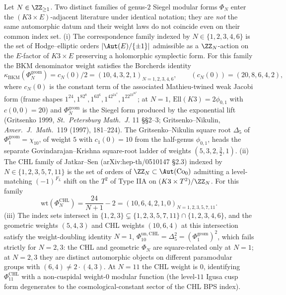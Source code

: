 \begin{theorem}
\label{thm:cy-c-beyond-k3e-chl-vs-programme-n-list}
Let $N\in\ZZ_{\ge 1}$. Two distinct families of genus-$2$ Siegel
modular forms $\Phi_N$ enter the $(K3\times E)$-adjacent literature
under identical notation; they are \emph{not} the same automorphic
datum and their weight laws do not coincide even on their common index
set.
\textup{(i)} The correspondence family indexed by $N\in\{1,2,3,4,6\}$ is the
set of Hodge--elliptic orders $|\Aut(E)/\{\pm 1\}|$ admissible as a
$\ZZ_N$-action on the $E$-factor of $K3\times E$ preserving a
holomorphic symplectic form. For this family the BKM denominator
weight satisfies the Borcherds identity
\begin{equation}
\label{eq:cy-c-beyond-k3e-programme-phi-N-weight}
\kappa_{\mathrm{BKM}}(\Phi_N^{\mathrm{geom}})
= c_N(0)/2
= (10,4,3,2,1)_{N=1,2,3,4,6},
\qquad
(c_N(0)) = (20,8,6,4,2),
\end{equation}
where $c_N(0)$ is the constant term of the associated Mathieu-twined
weak Jacobi form (frame shapes
$1^{24}, 1^82^8, 1^63^6, 1^42^24^4, 1^22^23^26^2$; at $N = 1$,
$\mathrm{Ell}(K3) = 2\phi_{0,1}$ with $c(0,0) = 20$) and
$\Phi_N^{\mathrm{geom}}$ is the Siegel form produced by the
exponential lift (Gritsenko 1999, \emph{St.\ Petersburg Math.\ J.}
11 §§2--3; Gritsenko--Nikulin, \emph{Amer.\ J.\ Math.}\ 119 (1997),
181--224). The Gritsenko--Nikulin square root $\Delta_5$ of
$\Phi_1^{\mathrm{geom}} = \chi_{10}$, of weight $5$ with
$c_1(0) = 10$ from the half-genus $\phi_{0,1}$, heads the separate
Govindarajan--Krishna square-root ladder of weights
$(5, 3, 2, \tfrac32, 1)$.
\textup{(ii)} The CHL family of Jatkar--Sen (arXiv:hep-th/0510147
§2.3) indexed by $N\in\{1,2,3,5,7,11\}$ is the set of orders of
$\ZZ_N\subset\Aut(\mathrm{Co}_0)$ admitting a level-matching
$(-1)^{F_L}$ shift on the $T^2$ of Type IIA on
$(K3\times T^2)/\ZZ_N$. For this family
\begin{equation}
\label{eq:cy-c-beyond-k3e-chl-phi-N-weight}
\mathrm{wt}(\Phi_N^{\mathrm{CHL}}) = \frac{24}{N+1}-2
= (10,6,4,2,1,0)_{N=1,2,3,5,7,11}.
\end{equation}
\textup{(iii)} The index sets intersect in
$\{1,2,3\}\subsetneq\{1,2,3,5,7,11\}\cap\{1,2,3,4,6\}$, and the
geometric weights $(5,4,3)$ and CHL weights $(10,6,4)$ at this
intersection satisfy the weight-doubling identity $N=1$,
\(\Phi_{10}^{\mathrm{un,CHL}}=\Delta_5^2=(\Phi_1^{\mathrm{geom}})^2\),
which fails strictly for $N=2,3$: the CHL and geometric $\Phi_N$ are
square-related only at $N=1$; at $N=2,3$ they are distinct
automorphic objects on different paramodular groups with
$(6,4)\ne 2\cdot(4,3)$. At $N=11$ the CHL weight is $0$, identifying
$\Phi_{11}^{\mathrm{CHL}}$ with a non-cuspidal weight-$0$ modular
function (the level-$11$ Igusa cusp form degenerates to the
cosmological-constant sector of the CHL BPS index).
\end{theorem}


